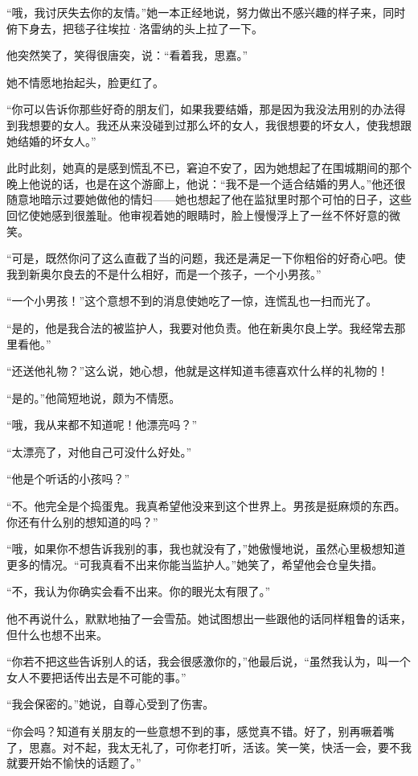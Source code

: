 \par “哦，我讨厌失去你的友情。”她一本正经地说，努力做出不感兴趣的样子来，同时俯下身去，把毯子往埃拉·洛雷纳的头上拉了一下。
\par 他突然笑了，笑得很唐突，说：“看着我，思嘉。”
\par 她不情愿地抬起头，脸更红了。
\par “你可以告诉你那些好奇的朋友们，如果我要结婚，那是因为我没法用别的办法得到我想要的女人。我还从来没碰到过那么坏的女人，我很想要的坏女人，使我想跟她结婚的坏女人。”
\par 此时此刻，她真的是感到慌乱不已，窘迫不安了，因为她想起了在围城期间的那个晚上他说的话，也是在这个游廊上，他说：“我不是一个适合结婚的男人。”他还很随意地暗示过要她做他的情妇——她也想起了他在监狱里时那个可怕的日子，这些回忆使她感到很羞耻。他审视着她的眼睛时，脸上慢慢浮上了一丝不怀好意的微笑。
\par “可是，既然你问了这么直截了当的问题，我还是满足一下你粗俗的好奇心吧。使我到新奥尔良去的不是什么相好，而是一个孩子，一个小男孩。”
\par “一个小男孩！”这个意想不到的消息使她吃了一惊，连慌乱也一扫而光了。
\par “是的，他是我合法的被监护人，我要对他负责。他在新奥尔良上学。我经常去那里看他。”
\par “还送他礼物？”这么说，她心想，他就是这样知道韦德喜欢什么样的礼物的！
\par “是的。”他简短地说，颇为不情愿。
\par “哦，我从来都不知道呢！他漂亮吗？”
\par “太漂亮了，对他自己可没什么好处。”
\par “他是个听话的小孩吗？”
\par “不。他完全是个捣蛋鬼。我真希望他没来到这个世界上。男孩是挺麻烦的东西。你还有什么别的想知道的吗？”
\par “哦，如果你不想告诉我别的事，我也就没有了，”她傲慢地说，虽然心里极想知道更多的情况。“可我真看不出来你能当监护人。”她笑了，希望他会仓皇失措。
\par “不，我认为你确实会看不出来。你的眼光太有限了。”
\par 他不再说什么，默默地抽了一会雪茄。她试图想出一些跟他的话同样粗鲁的话来，但什么也想不出来。
\par “你若不把这些告诉别人的话，我会很感激你的，”他最后说，“虽然我认为，叫一个女人不要把话传出去是不可能的事。”
\par “我会保密的。”她说，自尊心受到了伤害。
\par “你会吗？知道有关朋友的一些意想不到的事，感觉真不错。好了，别再噘着嘴了，思嘉。对不起，我太无礼了，可你老打听，活该。笑一笑，快活一会，要不我就要开始不愉快的话题了。”
